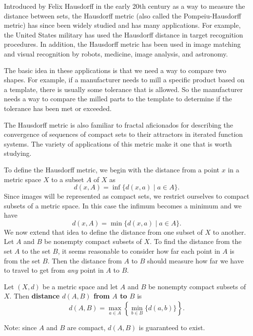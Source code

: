 \ee

\label{sec_fractals}

Introduced by Felix Hausdorff in the early 20th century as a way to measure the distance between sets, the Hausdorff metric  (also called the Pompeiu-Hausdorff metric) has since been widely studied and has many applications. For example, the United States military has used the Hausdorff distance in target recognition procedures. In addition, the Hausdorff metric has been used in image matching and visual recognition by robots, medicine, image analysis, and astronomy.

The basic idea in these applications is that we need a way to compare two shapes. For example, if a manufacturer needs to mill a specific product based on a template, there is usually some tolerance that is allowed. So the manufacturer needs a way to compare the milled parts to the template to determine if the tolerance has been met or exceeded.  
 
The Hausdorff metric is also familiar to fractal aficionados for describing the convergence of sequences of compact sets to their attractors in iterated function systems. The variety of applications of this metric make it one that is worth studying. 

To define the Hausdorff metric, we begin with the distance from a point $x$ in a metric space $X$ to a subset $A$ of $X$ as 
\[d(x,A) = \inf\{d(x,a) \mid a \in A\}.\]
Since images will be represented as compact sets, we restrict ourselves to compact subsets of a metric space. In this case the infimum becomes a minimum and we have 
\[d(x,A) = \min\{d(x,a) \mid a \in A\}.\]
We now extend that idea to define the distance from one subset of $X$ to another. Let $A$ and $B$ be nonempty compact subsets of $X$. To find the distance from the set $A$ to the set $B$, it seems reasonable to consider how far each point in $A$ is from the set $B$. Then the distance from $A$ to $B$ should measure how far we have to travel to get from \emph{any} point in $A$ to $B$. 


\begin{definition} \label{def:AtoB} Let $(X,d)$ be a metric space and let $A$ and $B$ be nonempty compact subsets of $X$. Then \textbf{distance $d(A,B)$ from $A$ to $B$} is 
\[d(A,B) = \max_{a \in A} \left\{ \min_{b \in B} \{d(a,b)\} \right\}.\]
\end{definition}
Note: since $A$ and $B$ are compact, $d(A,B)$ is guaranteed to exist.  


